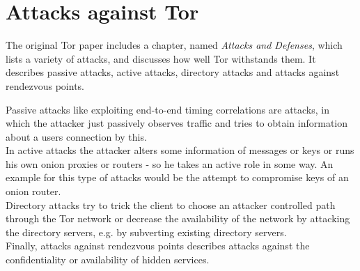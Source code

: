 \section{Attacks against Tor}
The original Tor paper includes a chapter, named \textit{Attacks and Defenses}, which lists a variety of attacks, and discusses how well Tor withstands them. It describes passive attacks, active attacks, directory attacks and attacks against rendezvous points. 

%
%

Passive attacks like exploiting end-to-end timing correlations are attacks, in which the attacker just passively observes traffic and tries to obtain information about a users connection by this.\\
In active attacks the attacker alters some information of messages or keys or runs his own onion proxies or routers - so he takes an active role in some way. An example for this type of attacks would be the attempt to compromise keys of an onion router.\\
Directory attacks try to trick the client to choose an attacker controlled path through the Tor network or decrease the availability of the network by attacking the directory servers, e.g. by subverting existing directory servers.\\
Finally, attacks against rendezvous points describes attacks against the confidentiality or availability of hidden services.